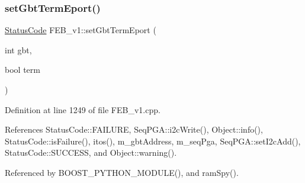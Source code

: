 \subsubsection{\texorpdfstring{set\+Gbt\+Term\+Eport()}{setGbtTermEport()}}
{\footnotesize\ttfamily \hyperlink{classStatusCode}{Status\+Code} F\+E\+B\+\_\+v1\+::set\+Gbt\+Term\+Eport (\begin{DoxyParamCaption}\item[{int}]{gbt,  }\item[{bool}]{term }\end{DoxyParamCaption})}



Definition at line 1249 of file F\+E\+B\+\_\+v1.\+cpp.



References Status\+Code\+::\+F\+A\+I\+L\+U\+RE, Seq\+P\+G\+A\+::i2c\+Write(), Object\+::info(), Status\+Code\+::is\+Failure(), itos(), m\+\_\+gbt\+Address, m\+\_\+seq\+Pga, Seq\+P\+G\+A\+::set\+I2c\+Add(), Status\+Code\+::\+S\+U\+C\+C\+E\+SS, and Object\+::warning().



Referenced by B\+O\+O\+S\+T\+\_\+\+P\+Y\+T\+H\+O\+N\+\_\+\+M\+O\+D\+U\+L\+E(), and ram\+Spy().



